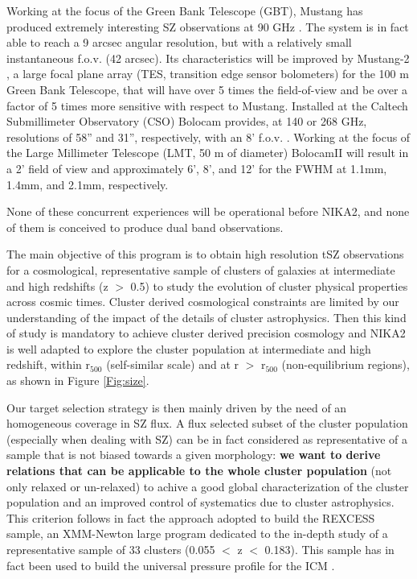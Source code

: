 \documentclass[11pt,a4paper,twoside,graphicx,color]{article}
\begin{document}
Working at the focus of the Green Bank Telescope (GBT), Mustang has produced extremely interesting SZ observations at 90 GHz \citep{Korngut2011, Mroczkowski2012, Young2014}. The system is in fact able to reach a 9 arcsec angular resolution, but with a relatively small instantaneous f.o.v. (42 arcsec). Its characteristics will be improved by Mustang-2 \citep{Mustang2}, a large focal plane array (TES, transition edge sensor bolometers) for the 100 m Green Bank Telescope, that will have over 5 times the field-of-view and be over a factor of 5 times more sensitive with respect to Mustang. Installed at the Caltech Submillimeter Observatory (CSO) Bolocam provides, at 140 or 268 GHz, resolutions of 58'' and 31'', respectively, with an 8' f.o.v. \citep{Sayers2011, Sayers2013, Czakon2014}. Working at the focus of the Large Millimeter Telescope (LMT, 50 m of diameter) BolocamII will result in a 2' field of view and approximately 6', 8', and 12' for the FWHM at 1.1mm, 1.4mm, and 2.1mm, respectively.

None of these concurrent experiences will be operational before NIKA2, and none of them is conceived to produce dual band observations. 

\vspace{0.3cm}  
The main objective of this program is to obtain high resolution tSZ observations for a cosmological, representative sample of clusters of galaxies at intermediate and high redshifts (z $>$ 0.5) to study the evolution of cluster physical properties across cosmic times. Cluster derived cosmological constraints are limited by our understanding of the impact of the details of cluster astrophysics. Then this kind of study is mandatory to achieve cluster derived precision cosmology and NIKA2 is well adapted to explore the cluster population at intermediate and high redshift, within r$_{500}$ (self-similar scale) and at r $>$ r$_{500}$ (non-equilibrium regions), as shown in Figure \ref{Fig:size}.

Our target selection strategy is then mainly driven by the need of an homogeneous coverage in SZ flux. A flux selected subset of the cluster population (especially when dealing with SZ) can be in fact considered as representative of a sample that is not biased towards a given morphology:  {\bf we want to derive relations that can be applicable to the whole cluster population} (not only relaxed or un-relaxed) to achive a good global characterization of the cluster population and an improved control of systematics due to cluster astrophysics.
This criterion follows in fact the approach adopted to build the REXCESS \citep{REXCESS} sample, an XMM-Newton large program dedicated to the in-depth study of a representative sample of 33 clusters (0.055 $<$ z $<$ 0.183). This sample has in fact been used to build the universal pressure profile for the ICM \citep{Arnaud2010}. 
\end{document}
